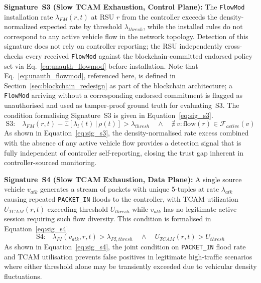 \documentclass[12pt, a4paper]{report}
\begin{document}
\textbf{Signature~S3 (Slow TCAM Exhaustion, Control Plane):}
The \texttt{FlowMod} installation rate $\lambda_{FM}(r,t)$ at RSU $r$
from the controller exceeds the density-normalized expected rate by
threshold $\lambda_{thresh}$, while the installed rules do not
correspond to any active vehicle flow in the network topology.
Detection of this signature does not rely on controller reporting;
the RSU independently cross-checks every received \texttt{FlowMod}
against the blockchain-committed endorsed policy set via
Eq.~\eqref{eq:unauth_flowmod} before installation.
Note that Eq.~\eqref{eq:unauth_flowmod}, referenced here, is
defined in Section~\eqref{sec:blockchain_redesign} as part of the blockchain
architecture; a \texttt{FlowMod} arriving without a corresponding
endorsed commitment is flagged as unauthorised and used as
tamper-proof ground truth for evaluating~S3.
The condition formalising Signature~S3 is given in
Equation~\eqref{eq:sig_s3}.
\begin{equation}
\text{S3:}\quad \lambda_{FM}(r,t) - \mathbb{E}[\lambda_l(t)\,|\,\rho(t)]
> \lambda_{thresh} \quad \land \quad
\nexists\, v : \text{flow}(r) \in \mathcal{F}_{active}(v)
\label{eq:sig_s3}
\end{equation}
As shown in Equation~\eqref{eq:sig_s3}, the density-normalised
rate excess combined with the absence of any active vehicle flow
provides a detection signal that is fully independent of controller
self-reporting, closing the trust gap inherent in controller-sourced
monitoring.

\textbf{Signature~S4 (Slow TCAM Exhaustion, Data Plane):}
A single source vehicle $v_{atk}$ generates a stream of packets with
unique 5-tuples at rate $\lambda_{atk}$ causing repeated
\texttt{PACKET\_IN} floods to the controller, with TCAM utilization
$U_{TCAM}(r,t)$ exceeding threshold $U_{thresh}$ while $v_{atk}$
has no legitimate active session requiring such flow diversity.
This condition is formalised in Equation~\eqref{eq:sig_s4}.
\begin{equation}
\text{S4:}\quad \lambda_{PI}(v_{atk}, r, t) > \lambda_{PI,thresh}
\quad \land \quad U_{TCAM}(r,t) > U_{thresh}
\label{eq:sig_s4}
\end{equation}
As shown in Equation~\eqref{eq:sig_s4}, the joint condition on
\texttt{PACKET\_IN} flood rate and TCAM utilisation prevents false
positives in legitimate high-traffic scenarios where either threshold
alone may be transiently exceeded due to vehicular density
fluctuations.
\end{document}
